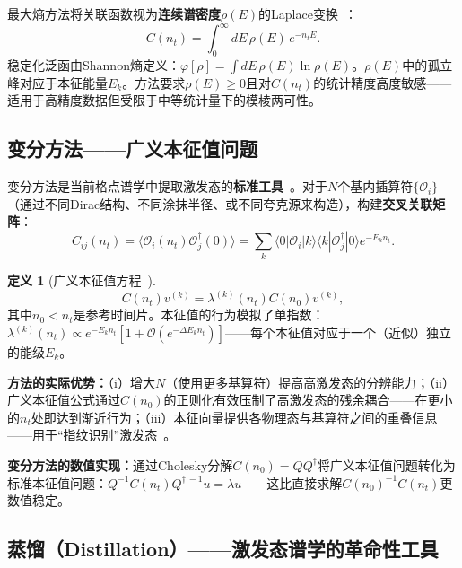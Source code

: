 \documentclass[12pt,a4paper]{ctexart}
\theoremstyle{definition}
\newtheorem{definition}{定义}[section]
\begin{document}
最大熵方法将关联函数视为\textbf{连续谱密度}$\rho(E)$的Laplace变换~\cite{GattringerLang2010}：
\begin{equation}
C(n_t) = \int_0^\infty dE\, \rho(E)\, e^{-n_t E}.
\label{eq:laplace_spectral}
\end{equation}
稳定化泛函由Shannon熵定义：$\varphi[\rho] = \int dE\, \rho(E)\ln\rho(E)$。$\rho(E)$中的孤立峰对应于本征能量$E_k$。方法要求$\rho(E) \ge 0$且对$C(n_t)$的统计精度高度敏感——适用于高精度数据但受限于中等统计量下的模棱两可性。

\subsection{变分方法——广义本征值问题}

变分方法是当前格点谱学中提取激发态的\textbf{标准工具}~\cite{GattringerLang2010}。对于$N$个基内插算符$\{\mathcal{O}_i\}$（通过不同Dirac结构、不同涂抹半径、或不同夸克源来构造），构建\textbf{交叉关联矩阵}：
\begin{equation}
C_{ij}(n_t) = \langle \mathcal{O}_i(n_t) \mathcal{O}_j^\dagger(0) \rangle = \sum_k \langle 0|\mathcal{O}_i|k\rangle \langle k|\mathcal{O}_j^\dagger|0\rangle e^{-E_k n_t}.
\label{eq:corr_matrix}
\end{equation}

\begin{definition}[广义本征值方程~\cite{GattringerLang2010}]
\begin{equation}
\boxed{C(n_t) v^{(k)} = \lambda^{(k)}(n_t) C(n_0) v^{(k)}},
\label{eq:GEVP}
\end{equation}
其中$n_0 < n_t$是参考时间片。本征值的行为模拟了单指数：$\lambda^{(k)}(n_t) \propto e^{-E_k n_t}[1 + \mathcal{O}(e^{-\Delta E_k n_t})]$——每个本征值对应于一个（近似）独立的能级$E_k$。
\end{definition}

\textbf{方法的实际优势：}（i）增大$N$（使用更多基算符）提高高激发态的分辨能力；（ii）广义本征值公式通过$C(n_0)$的正则化有效压制了高激发态的残余耦合——在更小的$n_t$处即达到渐近行为；（iii）本征向量提供各物理态与基算符之间的重叠信息——用于``指纹识别''激发态~\cite{GattringerLang2010}。

\textbf{变分方法的数值实现：}通过Cholesky分解$C(n_0) = Q Q^\dagger$将广义本征值问题转化为标准本征值问题：$Q^{-1}C(n_t) Q^{\dagger\,-1} u = \lambda u$——这比直接求解$C(n_0)^{-1}C(n_t)$更数值稳定。

\subsection{蒸馏（Distillation）——激发态谱学的革命性工具}
\end{document}
